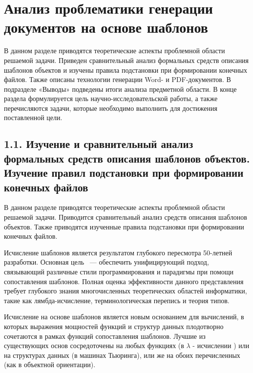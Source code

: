 \chapter{Анализ проблематики генерации документов на основе шаблонов}
\label{chapter1}


В данном разделе приводятся теоретические аспекты проблемной области решаемой задачи. Приведен сравнительный анализ формальных средств описания шаблонов объектов и изучены правила подстановки при формировании конечных файлов. Также описаны технологии генерации Word- и PDF-документов. В подразделе «Выводы» подведены итоги анализа предметной области. В конце раздела формулируется цель научно-исследовательской работы, а также перечисляются задачи, которые необходимо выполнить для достижения поставленной цели.






\section{1.1. Изучение и сравнительный анализ формальных средств описания шаблонов объектов. Изучение правил подстановки при формировании конечных файлов}


В данном разделе приводятся теоретические аспекты проблемной области решаемой задачи. Приводится сравнительный анализ средств описания шаблонов объектов. Также приводятся изученные правила подстановки при формировании конечных файлов.



Исчисление шаблонов является результатом глубокого пересмотра 50-летней разработки. Основная цель ~--- обеспечить унифицирующий подход, связывающий различные стили программирования и парадигмы при помощи сопоставления шаблонов. Полная оценка эффективности данного представления требует глубокого знания
многочисленных теоретических областей информатики, такие как лямбда-исчисление, терминологическая перепись и теория типов.

Исчисление на основе шаблонов является новым основанием для вычислений, в которых выражения мощностей функций и структур данных плодотворно сочетаются в рамках функций сопоставления шаблонов. Лучшие из существующих основ сосредоточены на любых функциях (в $ \lambda $ - исчислении ) или на структурах данных (в машинах Тьюринга), или же на обоих перечисленных (как в объектной ориентации). 


